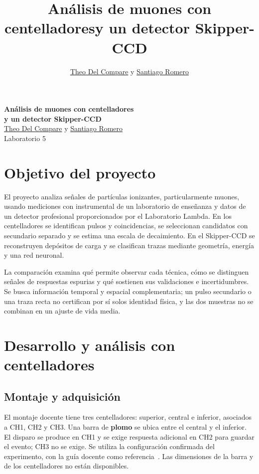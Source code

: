 \documentclass[10pt,a4paper]{article}
\title{\vspace{-1.2cm}\textbf{Análisis de muones con centelladores\newline y un detector Skipper-CCD}}
\author{\href{mailto:Theo.Del.Compare@gmail.com}{Theo Del Compare} \quad y \quad \href{mailto:romerosantiago545@gmail.com}{Santiago Romero}}
\date{}
\begin{document}
\begin{center}
{\Large\bfseries Análisis de muones con centelladores\\[2pt] y un detector Skipper-CCD}\\[5pt]
\href{mailto:Theo.Del.Compare@gmail.com}{Theo Del Compare} \quad y \quad \href{mailto:romerosantiago545@gmail.com}{Santiago Romero}\\[2pt]
{\small Laboratorio 5}
\end{center}
\vspace{-2mm}
\section{Objetivo del proyecto}
El proyecto analiza señales de partículas ionizantes, particularmente muones, usando mediciones con instrumental de un laboratorio de enseñanza y datos de un detector profesional proporcionados por el Laboratorio Lambda. En los centelladores se identifican pulsos y coincidencias, se seleccionan candidatos con secundario separado y se estima una escala de decaimiento. En el Skipper-CCD se reconstruyen depósitos de carga y se clasifican trazas mediante geometría, energía y una red neuronal.

La comparación examina qué permite observar cada técnica, cómo se distinguen señales de respuestas espurias y qué sostienen sus validaciones e incertidumbres. Se busca información temporal y espacial complementaria; un pulso secundario o una traza recta no certifican por sí solos identidad física, y las dos muestras no se combinan en un ajuste de vida media.

\section{Desarrollo y análisis con centelladores}

\subsection{Montaje y adquisición}
El montaje docente tiene tres centelladores: superior, central e inferior, asociados a CH1, CH2 y CH3. Una barra de \textbf{plomo} se ubica entre el central y el inferior. El disparo se produce en CH1 y se exige respuesta adicional en CH2 para guardar el evento; CH3 no se exige. Se utiliza la configuración confirmada del experimento, con la guía docente como referencia~\cite{guia}. Las dimensiones de la barra y de los centelladores no están disponibles.
\end{document}
